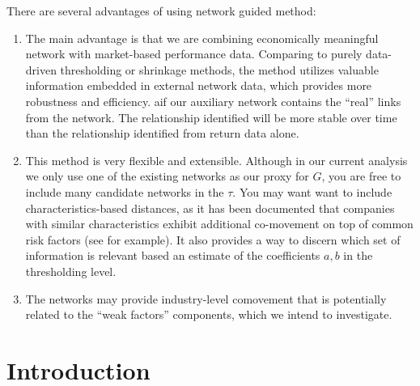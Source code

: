 There are several advantages of using network guided method:
\begin{enumerate}
    \item The main advantage is that we are combining economically meaningful network with market-based performance data. Comparing to purely data-driven thresholding or shrinkage methods, the method utilizes valuable information embedded in external network data, which provides more robustness and efficiency. aif our auxiliary network contains the ``real'' links from the network. The relationship identified will be more stable over time than the relationship identified from return data alone. 
    \item This method is very flexible and extensible. Although in our current analysis we only use one of the existing networks as our proxy for $G$, you are free to include many candidate networks in the \(\tau\). You may want want to include characteristics-based distances, as it has been documented that companies with similar characteristics exhibit additional co-movement on top of common risk factors (see \cite{fernandez2011spatial} for example). It also provides a way to discern which set of information is relevant based an estimate of the coefficients \(a,b\) in the thresholding level. 
    \item The networks may provide industry-level comovement that is potentially related to the ``weak factors'' components, which we intend to investigate. 
\end{enumerate}

\section{Introduction}

